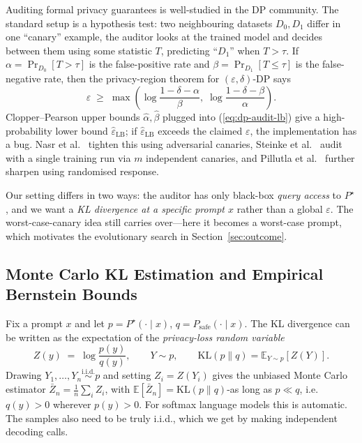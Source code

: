 \documentclass{article}
\begin{document}
Auditing formal privacy guarantees is well-studied in the DP community. The standard setup \cite{jagielski2020auditing,nasr2023tight} is a hypothesis test: two neighbouring datasets $D_0,D_1$ differ in one ``canary'' example, the auditor looks at the trained model and decides between them using some statistic $T$, predicting ``$D_1$'' when $T>\tau$. If $\alpha=\Pr_{D_0}[T>\tau]$ is the false-positive rate and $\beta=\Pr_{D_1}[T\le\tau]$ is the false-negative rate, then the privacy-region theorem for $(\varepsilon,\delta)$-DP \cite[Thm.~2.1]{jagielski2020auditing} says
\begin{equation}
\label{eq:dp-audit-lb}
  \varepsilon \;\ge\; \max\!\left(\log\!\frac{1-\delta-\alpha}{\beta},\;\log\!\frac{1-\delta-\beta}{\alpha}\right).
\end{equation}
Clopper--Pearson upper bounds $\hat{\alpha},\hat{\beta}$ plugged into (\ref{eq:dp-audit-lb}) give a high-probability lower bound $\hat{\varepsilon}_{\mathrm{LB}}$; if $\hat{\varepsilon}_{\mathrm{LB}}$ exceeds the claimed $\varepsilon$, the implementation has a bug. Nasr et al.\ \cite{nasr2023tight} tighten this using adversarial canaries, Steinke et al.\ \cite{steinke2023one} audit with a single training run via $m$ independent canaries, and Pillutla et al.\ \cite{pillutla2023auditing} further sharpen using randomised response.

Our setting differs in two ways: the auditor has only black-box \emph{query access} to $P^\star$, and we want a \emph{KL divergence at a specific prompt $x$} rather than a global $\varepsilon$. The worst-case-canary idea still carries over---here it becomes a worst-case prompt, which motivates the evolutionary search in Section~\ref{sec:outcome}.

\subsection{Monte Carlo KL Estimation and Empirical Bernstein Bounds}

Fix a prompt $x$ and let $p = P^\star(\cdot\mid x)$, $q = P_{\mathrm{safe}}(\cdot\mid x)$. The KL divergence can be written as the expectation of the \emph{privacy-loss random variable}
\begin{equation}
\label{eq:plrv}
  Z(y) \;=\; \log\frac{p(y)}{q(y)},\qquad Y\sim p,\qquad \mathrm{KL}(p\|q)=\mathbb{E}_{Y\sim p}[Z(Y)].
\end{equation}
Drawing $Y_1,\ldots,Y_n\overset{\text{i.i.d.}}{\sim}p$ and setting $Z_i = Z(Y_i)$ gives the unbiased Monte Carlo estimator $\bar{Z}_n=\frac{1}{n}\sum_i Z_i$, with $\mathbb{E}[\bar{Z}_n] = \mathrm{KL}(p\|q)$-as long as $p\ll q$, i.e.\ $q(y)>0$ wherever $p(y)>0$. For softmax language models this is automatic. The samples also need to be truly i.i.d., which we get by making independent decoding calls.
\end{document}
